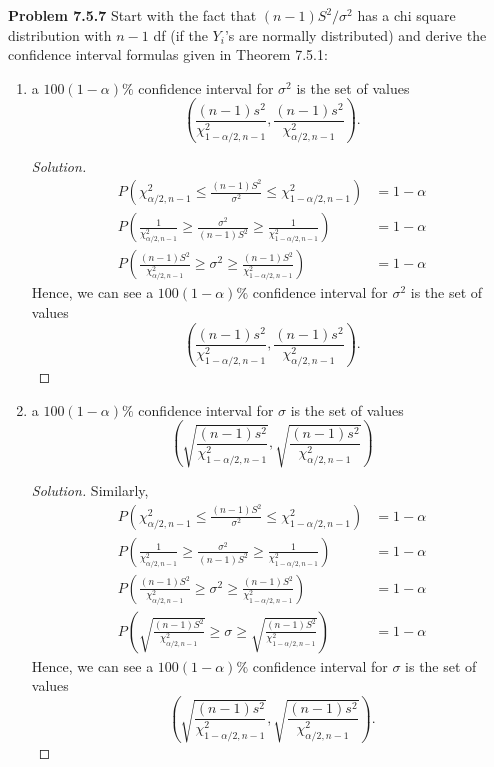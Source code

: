 \documentclass{article}
\begin{document}
\newpage
\textbf{Problem 7.5.7}
Start with the fact that $(n - 1)S^2/\sigma^2$ has a chi square distribution with $n - 1$ df (if the $Y_i$'s are normally distributed) and derive the confidence interval formulas given in Theorem 7.5.1:
\begin{enumerate}[label=(\alph*)]
    \item 
    a $100(1-\alpha)\%$ confidence interval for $\sigma^2$ is the set of values $$\left(\frac{(n-1)s^2}{\chi^2_{1-\alpha/2, n-1}}, \frac{(n-1)s^2}{\chi^2_{\alpha/2, n-1}}\right).$$
    \begin{proof}[Solution]
        \begin{align*}
            P\left(\chi^2_{\alpha/2, n-1}\le \frac{(n-1)S^2}{\sigma^2} \le \chi^2_{1-\alpha/2, n-1}\right) &= 1-\alpha \\
            P\left(\frac{1}{\chi^2_{\alpha/2, n-1}}\ge \frac{\sigma^2}{(n-1)S^2} \ge \frac{1}{\chi^2_{1-\alpha/2, n-1}}\right) &= 1-\alpha \\
            P\left(\frac{(n-1)S^2}{\chi^2_{\alpha/2, n-1}}\ge \sigma^2 \ge \frac{(n-1)S^2}{\chi^2_{1-\alpha/2, n-1}}\right) &= 1-\alpha 
        \end{align*}
        Hence, we can see a $100(1-\alpha)\%$ confidence interval for $\sigma^2$ is the set of values $$\left(\frac{(n-1)s^2}{\chi^2_{1-\alpha/2, n-1}}, \frac{(n-1)s^2}{\chi^2_{\alpha/2, n-1}}\right).$$
    \end{proof}

    \item
    a $100(1-\alpha)\%$ confidence interval for $\sigma$ is the set of values $$\left(\sqrt{\frac{(n-1)s^2}{\chi^2_{1-\alpha/2, n-1}}}, \sqrt{\frac{(n-1)s^2}{\chi^2_{\alpha/2, n-1}}}\right)$$
    \begin{proof}[Solution]
        Similarly,
        \begin{align*}
            P\left(\chi^2_{\alpha/2, n-1}\le \frac{(n-1)S^2}{\sigma^2} \le \chi^2_{1-\alpha/2, n-1}\right) &= 1-\alpha \\
            P\left(\frac{1}{\chi^2_{\alpha/2, n-1}}\ge \frac{\sigma^2}{(n-1)S^2} \ge \frac{1}{\chi^2_{1-\alpha/2, n-1}}\right) &= 1-\alpha \\
            P\left(\frac{(n-1)S^2}{\chi^2_{\alpha/2, n-1}}\ge \sigma^2 \ge \frac{(n-1)S^2}{\chi^2_{1-\alpha/2, n-1}}\right) &= 1-\alpha \\
            P\left(\sqrt{\frac{(n-1)S^2}{\chi^2_{\alpha/2, n-1}}}\ge \sigma \ge \sqrt{\frac{(n-1)S^2}{\chi^2_{1-\alpha/2, n-1}}}\right) &= 1-\alpha 
        \end{align*}
        Hence, we can see a $100(1-\alpha)\%$ confidence interval for $\sigma$ is the set of values $$\left(\sqrt{\frac{(n-1)s^2}{\chi^2_{1-\alpha/2, n-1}}}, \sqrt{\frac{(n-1)s^2}{\chi^2_{\alpha/2, n-1}}}\right).$$
    \end{proof}
\end{enumerate}
\bigbreak
\end{document}
